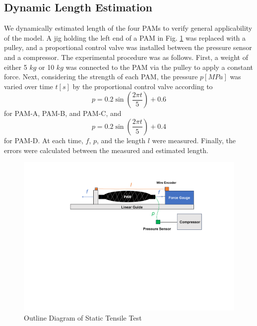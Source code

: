 \subsection{Dynamic Length Estimation}
We dynamically estimated length of the four PAMs to verify general applicability of the model.
A jig holding the left end of a PAM in Fig. \ref{fig:static_equipment} was replaced with a pulley, and a proportional control valve was installed between the pressure sensor and a compressor.
The experimental procedure was as follows. First, a weight of either 5 $\si{kg}$ or 10 $\si{kg}$ was connected to the PAM via the pulley to apply a constant force. Next, considering the strength of each PAM, the pressure $p [\si{MPa}]$ was varied over time $t [\si{s}]$ by the proportional control valve according to
\begin{equation}
p = 0.2 \sin\left(\frac{2 \pi t}{5}\right) + 0.6
\label{eq:Pref}
\end{equation}
for PAM-A, PAM-B, and PAM-C, and
\begin{equation}
p = 0.2 \sin\left(\frac{2 \pi t}{5}\right) + 0.4
\label{eq:Prefd}
\end{equation}
for PAM-D. At each time, $f$, $p$, and the length $l$ were measured. 
Finally, the errors were calculated between the measured and estimated length.
\begin{figure}[t]
    \centering
    \includegraphics[width=\columnwidth]{fig/static_experiment.pdf}
    \caption{Outline Diagram of Static Tensile Test}
    \label{fig:static_equipment}
 \end{figure}
